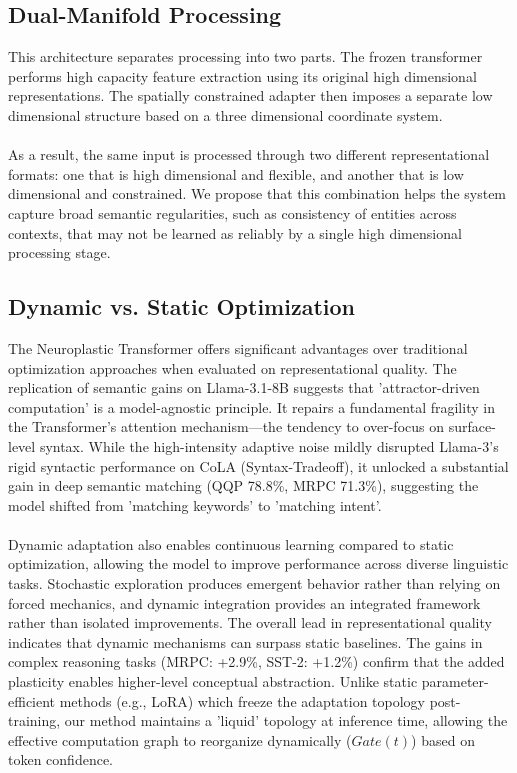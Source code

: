 \documentclass[11pt, letterpaper]{article}
\begin{document}
\subsection{Dual-Manifold Processing}
This architecture separates processing into two parts. The frozen transformer performs high capacity feature extraction using its original high dimensional representations. The spatially constrained adapter then imposes a separate low dimensional structure based on a three dimensional coordinate system.

\paragraph{}
As a result, the same input is processed through two different representational formats: one that is high dimensional and flexible, and another that is low dimensional and constrained. We propose that this combination helps the system capture broad semantic regularities, such as consistency of entities across contexts, that may not be learned as reliably by a single high dimensional processing stage.

\subsection{Dynamic vs. Static Optimization}
The Neuroplastic Transformer offers significant advantages over traditional 
optimization approaches when evaluated on representational quality. The 
replication of semantic gains on Llama-3.1-8B suggests that 'attractor-driven computation' is a model-agnostic principle. It repairs a fundamental fragility in the Transformer's attention mechanism—the tendency to over-focus on surface-level syntax. While the high-intensity adaptive noise mildly disrupted Llama-3's rigid syntactic performance on CoLA (Syntax-Tradeoff), it unlocked a substantial gain in deep semantic matching (QQP 78.8\%, MRPC 71.3\%), suggesting the model shifted from 'matching keywords' to 'matching intent'.

\paragraph{}
Dynamic adaptation also enables continuous learning compared to static optimization, allowing the model to improve performance across diverse linguistic tasks. Stochastic exploration produces emergent behavior rather than relying on forced mechanics, and dynamic integration provides an integrated framework rather than isolated improvements. The overall lead in 
representational quality indicates that dynamic mechanisms can surpass static baselines. The gains in complex reasoning tasks (MRPC: +2.9\%, SST-2: +1.2\%) confirm that the added plasticity enables higher-level conceptual abstraction. Unlike static parameter-efficient methods (e.g., LoRA) which freeze the adaptation topology post-training, our method maintains a 'liquid' topology at inference time, allowing the effective computation graph to reorganize dynamically ($Gate(t)$) based on token confidence.
\end{document}
